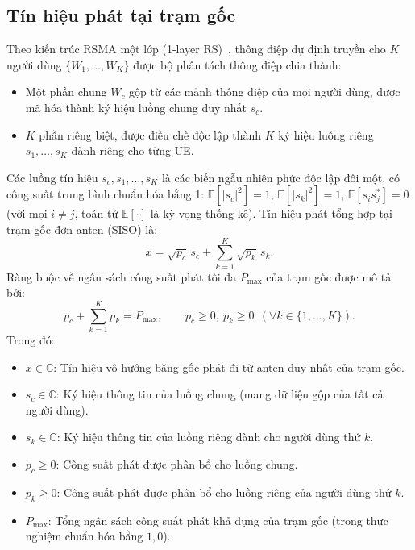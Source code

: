 \subsection{Tín hiệu phát tại trạm gốc}
\label{ssec:tin-hieu-phat}

Theo kiến trúc RSMA một lớp (1-layer RS)~\cite{Mao2018RSMABridging}, thông điệp dự định truyền cho $K$ người
dùng $\{W_1, \dots, W_K\}$ được bộ phân tách thông điệp chia thành:
\begin{itemize}
\item Một phần chung $W_c$ gộp từ các mảnh thông điệp của mọi người dùng, được mã hóa thành ký hiệu luồng
  chung duy nhất $s_c$.
\item $K$ phần riêng biệt, được điều chế độc lập thành $K$ ký hiệu luồng riêng
  $s_1, \dots, s_K$ dành riêng cho từng UE.
\end{itemize}
Các luồng tín hiệu $s_c, s_1, \dots, s_K$ là các biến ngẫu nhiên phức độc lập đôi một, có công suất trung bình
chuẩn hóa bằng 1: $\mathbb{E}[|s_c|^2] = 1$, $\mathbb{E}[|s_k|^2] = 1$, $\mathbb{E}[s_i s_j^*] = 0$ (với mọi
$i \neq j$, toán tử $\mathbb{E}[\cdot]$ là kỳ vọng thống kê). Tín hiệu phát tổng hợp tại trạm gốc đơn anten
(SISO) là:
\begin{equation}
x = \sqrt{p_c}\, s_c + \sum_{k=1}^{K} \sqrt{p_k}\, s_k .
\label{eq:tin-hieu-phat}
\end{equation}
Ràng buộc về ngân sách công suất phát tối đa $P_{\max}$ của trạm gốc được mô tả bởi:
\begin{equation}
p_c + \sum_{k=1}^{K} p_k = P_{\max}, \qquad p_c \ge 0,\ p_k \ge 0\ \ (\forall k \in \{1, \dots, K\}).
\label{eq:ngan-sach-cong-suat}
\end{equation}
Trong đó:
\begin{itemize}
\item $x \in \mathbb{C}$: Tín hiệu vô hướng băng gốc phát đi từ anten duy nhất của trạm gốc.
\item $s_c \in \mathbb{C}$: Ký hiệu thông tin của luồng chung (mang dữ liệu gộp của tất cả người dùng).
\item $s_k \in \mathbb{C}$: Ký hiệu thông tin của luồng riêng dành cho người dùng thứ $k$.
\item $p_c \ge 0$: Công suất phát được phân bổ cho luồng chung.
\item $p_k \ge 0$: Công suất phát được phân bổ cho luồng riêng của người dùng thứ $k$.
\item $P_{\max}$: Tổng ngân sách công suất phát khả dụng của trạm gốc (trong thực nghiệm chuẩn hóa bằng
  $1,0$).
\end{itemize}

